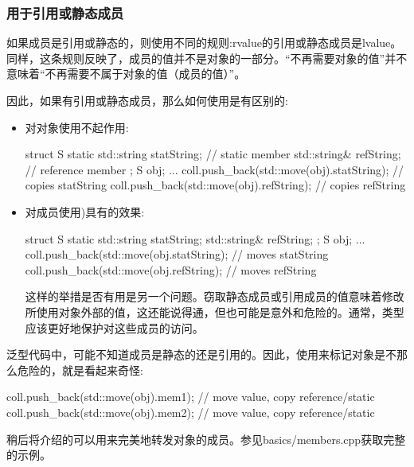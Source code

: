 \subsubsection{用于引用或静态成员}

如果成员是引用或静态的，则使用不同的规则:rvalue的引用或静态成员是lvalue。同样，这条规则反映了，成员的值并不是对象的一部分。“不再需要对象的值”并不意味着“不再需要不属于对象的值（成员的值）”。

因此，如果有引用或静态成员，那么如何使用是有区别的:

\begin{itemize}
	\item 对对象使用不起作用:

	\begin{cppcode}
struct S {
	static std::string statString; // static member
	std::string& refString; // reference member
};
S obj;
...
coll.push_back(std::move(obj).statString); // copies statString
coll.push_back(std::move(obj).refString); // copies refString
	\end{cppcode}
	\item 对成员使用)具有的效果:

	\begin{cppcode}
struct S {
	static std::string statString;
	std::string& refString;
};
S obj;
...
coll.push_back(std::move(obj.statString); // moves statString
coll.push_back(std::move(obj.refString); // moves refString
	\end{cppcode}
	这样的举措是否有用是另一个问题。窃取静态成员或引用成员的值意味着修改所使用对象外部的值，这还能说得通，但也可能是意外和危险的。通常，类型应该更好地保护对这些成员的访问。

\end{itemize}

泛型代码中，可能不知道成员是静态的还是引用的。因此，使用来标记对象是不那么危险的，就是看起来奇怪:

\begin{cppcode}
coll.push_back(std::move(obj).mem1); // move value, copy reference/static
coll.push_back(std::move(obj).mem2); // move value, copy reference/static
\end{cppcode}

稍后将介绍的可以用来完美地转发对象的成员。参见basics/members.cpp获取完整的示例。

























